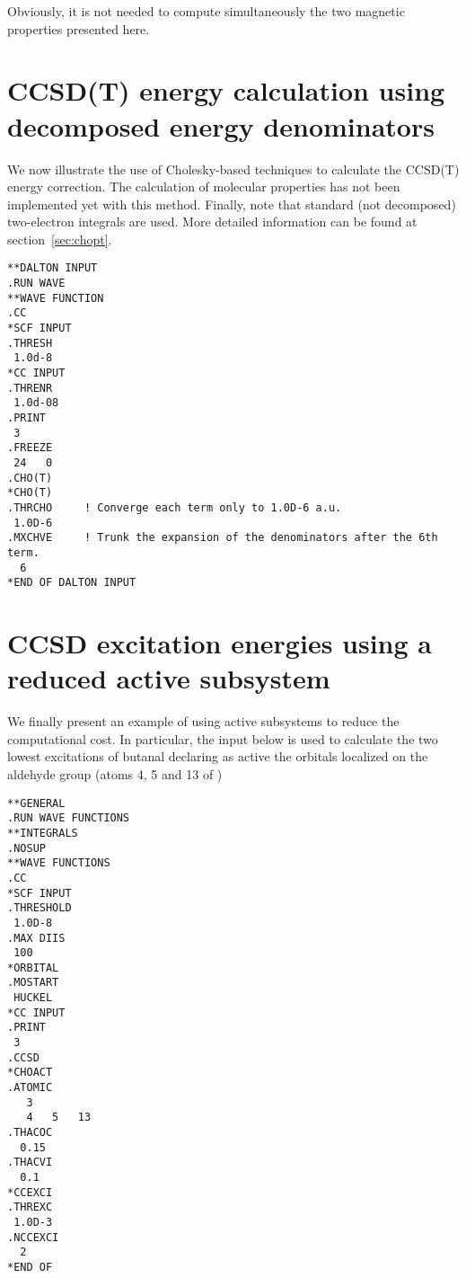 Obviously, it is not needed to compute simultaneously the two
magnetic properties presented here.

\section{CCSD(T) energy calculation using decomposed 
         energy denominators}

We now illustrate the use of Cholesky-based techniques to calculate
the CCSD(T) energy correction. The calculation of molecular 
properties has not been implemented yet with this method. Finally,
note that standard (not decomposed) two-electron integrals are 
used. More detailed information can be found at section~\ref{sec:chopt}.

\begin{verbatim}
**DALTON INPUT
.RUN WAVE
**WAVE FUNCTION
.CC
*SCF INPUT
.THRESH
 1.0d-8
*CC INPUT
.THRENR
 1.0d-08
.PRINT
 3
.FREEZE
 24   0
.CHO(T)
*CHO(T)
.THRCHO     ! Converge each term only to 1.0D-6 a.u.
 1.0D-6
.MXCHVE     ! Trunk the expansion of the denominators after the 6th term.
  6
*END OF DALTON INPUT
\end{verbatim}

\section{CCSD excitation energies using a reduced active subsystem}

We finally present an example of using active subsystems to reduce the 
computational cost. In particular, the input below is used
to calculate the two lowest excitations of
butanal declaring as active the orbitals localized on the aldehyde group 
(atoms 4, 5 and 13 of \molinp)

\begin{verbatim}
**GENERAL
.RUN WAVE FUNCTIONS
**INTEGRALS
.NOSUP
**WAVE FUNCTIONS
.CC
*SCF INPUT
.THRESHOLD
 1.0D-8
.MAX DIIS
 100
*ORBITAL
.MOSTART
 HUCKEL
*CC INPUT
.PRINT
 3
.CCSD
*CHOACT
.ATOMIC
   3
   4   5   13
.THACOC
  0.15
.THACVI
  0.1
*CCEXCI
.THREXC
 1.0D-3
.NCCEXCI
  2
*END OF
\end{verbatim}
